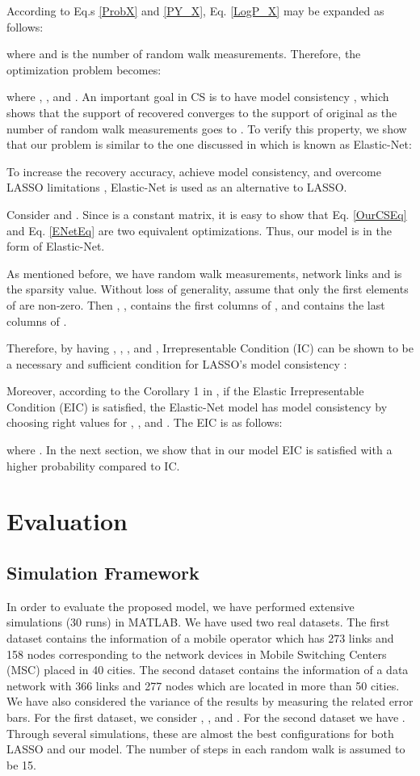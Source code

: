 \documentclass{article}
\begin{document}
According to Eq.s \eqref{ProbX} and \eqref{PY_X}, Eq. \eqref{LogP_X} may be expanded 
as follows:

where  and  is the number of random walk measurements. Therefore, the optimization problem becomes:
 
where , , and .
An important goal in CS is to have model consistency \cite{ENet}, which shows that the support of recovered  converges to the support of original  as the number of random walk measurements goes to . To verify this property, we show that our problem is similar to the one discussed in \cite{ENet} which is known as Elastic-Net:
 
To increase the recovery accuracy, achieve model consistency, and overcome LASSO limitations \cite{ENet}, Elastic-Net is used as an alternative to LASSO.

Consider  and . Since  is a constant matrix, it is easy to show that Eq. \eqref{OurCSEq} and Eq. \eqref{ENetEq} are two equivalent optimizations. Thus, our model is in the form of Elastic-Net.


As mentioned before, we have  random walk measurements,  network links and  is the sparsity value. 
Without loss of generality, assume that only the first  elements of  are non-zero. Then , ,  contains the first  columns of , and  contains the last  columns of .

Therefore, by having , , , and , Irrepresentable Condition (IC) can be shown to be a necessary and sufficient condition for LASSO's model consistency \cite{ENet}:
 
Moreover, according to the Corollary 1 in \cite{ENet}, if the Elastic Irrepresentable Condition (EIC) is satisfied, the Elastic-Net model has model consistency by choosing right values for , , and . The EIC is as follows:
 
where .
In the next section, we show that in our model EIC is satisfied with a higher probability compared to IC.
\section{Evaluation}
\label{Evaluation}
\subsection{Simulation Framework}
In order to evaluate the proposed model, we have performed extensive simulations (30 runs) in MATLAB. We have used two real datasets. The first dataset contains the information of a mobile operator which has 273 links and 158 nodes corresponding to the network devices in Mobile Switching Centers (MSC) placed in 40 cities. The second dataset contains the information of a data network with 366 links and 277 nodes which are located in more than 50 cities. We have also considered the variance of the results by measuring the related error bars. For the first dataset, we consider  , , and . For the second dataset we have  . Through several simulations, these are almost the best configurations for both LASSO and our model. The number of steps in each random walk is assumed to be 15.
\end{document}
